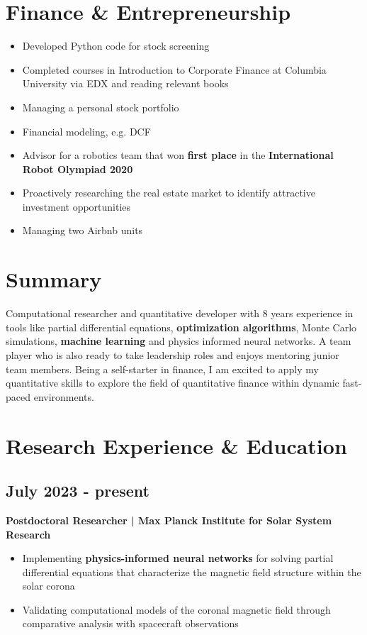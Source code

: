 \documentclass[11pt,a4paper]{article}
\begin{document}
\begin{multicols}{2}
		\section{Finance \& Entrepreneurship}
		\begin{itemize}
			\item Developed Python code for stock screening
			\item Completed courses in Introduction to Corporate Finance at Columbia University via EDX and reading relevant books
			\item Managing a personal stock portfolio
			\item Financial modeling, e.g. DCF
			\item Advisor for a robotics team that won \textbf{first place} in the \textbf{International Robot Olympiad 2020}
			\item Proactively researching the real estate market to identify attractive investment opportunities
			\item Managing two Airbnb units
		\end{itemize}
		
		\columnbreak
		
		\section{Summary}
		Computational researcher and quantitative developer with 8 years experience in tools like partial differential equations, \textbf{optimization algorithms}, Monte Carlo simulations, \textbf{machine learning} and physics informed neural networks. A team player who is also ready to take leadership roles and enjoys mentoring junior team members. Being a self-starter in finance, I am excited to apply my quantitative skills to explore the field of quantitative finance within dynamic fast-paced environments.
		
		\section{Research Experience \& Education}
		
		\subsection{July 2023 - present}
		\textbf{Postdoctoral Researcher | Max Planck Institute for Solar System Research}
		\begin{itemize}
			\item Implementing \textbf{physics-informed neural networks} for solving partial differential equations that characterize the magnetic field structure within the solar corona
			\item Validating computational models of the coronal magnetic field through comparative analysis with spacecraft observations
		\end{itemize}
		

\end{multicols}
\end{document}
